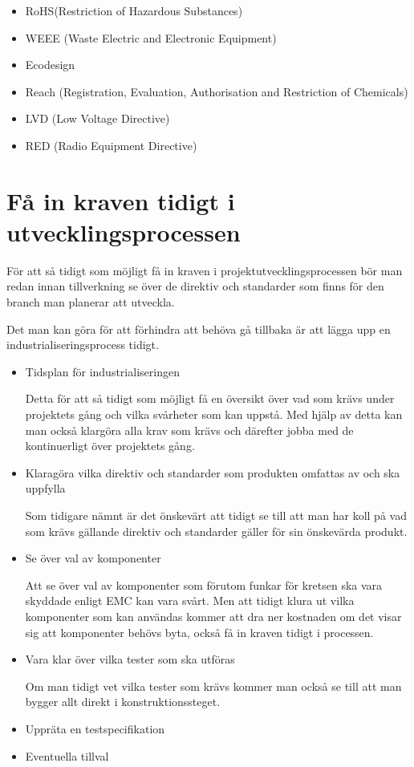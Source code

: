 \documentclass{article}
\begin{document}
    \begin{itemize}
        \item RoHS(Restriction of Hazardous Substances)
        \item WEEE (Waste Electric and Electronic Equipment)
        \item Ecodesign
        \item Reach (Registration, Evaluation, Authorisation and Restriction of Chemicals)
        \item LVD (Low Voltage Directive)
        \item RED (Radio Equipment Directive)
    \end{itemize}

\section{Få in kraven tidigt i utvecklingsprocessen}

För att så tidigt som möjligt få in kraven i projektutvecklingsprocessen bör man redan innan tillverkning se över de direktiv och standarder som finns för den branch man planerar att utveckla.

Det man kan göra för att förhindra att behöva gå tillbaka är att lägga upp en industrialiseringsprocess tidigt. \cite{andersson_2019}
\begin{itemize}
    \item Tidsplan för industrialiseringen

        Detta för att så tidigt som möjligt få en översikt över vad som krävs under projektets gång och vilka svårheter som kan uppstå. Med hjälp av detta kan man också klargöra alla krav som krävs och därefter jobba med de kontinuerligt över projektets gång. 
        
    \item Klaragöra vilka direktiv och standarder som produkten omfattas av och ska uppfylla

        Som tidigare nämnt är det önskevärt att tidigt se till att man har koll på vad som krävs gällande direktiv och standarder gäller för sin önskevärda produkt.       
    
    \item Se över val av komponenter

        Att se över val av komponenter som förutom funkar för kretsen ska vara skyddade enligt EMC kan vara svårt. Men att tidigt klura ut vilka komponenter som kan användas kommer att dra ner kostnaden om det visar sig att komponenter behövs byta, också få in kraven tidigt i processen. 

    \item Vara klar över vilka tester som ska utföras

        Om man tidigt vet vilka tester som krävs kommer man också se till att man bygger allt direkt i konstruktionssteget.  
    
    \item Uppräta en testspecifikation

    \item Eventuella tillval

\end{itemize}




\end{document}
